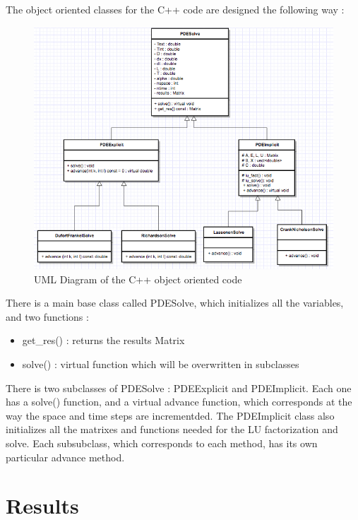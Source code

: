 \documentclass{article}
\begin{document}
            The object oriented classes for the C++ code are designed the following way :\\
            \begin{figure}[H]
                \includegraphics[width=\textwidth]{UML.png}
                \caption{UML Diagram of the C++ object oriented code}
            \end{figure}
            There is a main base class called PDESolve, which initializes all the variables, and two functions :
            \begin{itemize}
                \item{get\_res() : returns the results Matrix}
                \item{solve() : virtual function which will be overwritten in subclasses}
            \end{itemize}
            There is two subclasses of PDESolve : PDEExplicit and PDEImplicit. Each one has a solve() function, and a virtual advance function,
            which corresponds at the way the space and time steps are incrementded.
            The PDEImplicit class also initializes all the matrixes and functions needed for the LU factorization and solve.
            Each subsubclass, which corresponds to each method, has its own particular advance method.
    \newpage
    \section{Results}
\end{document}

